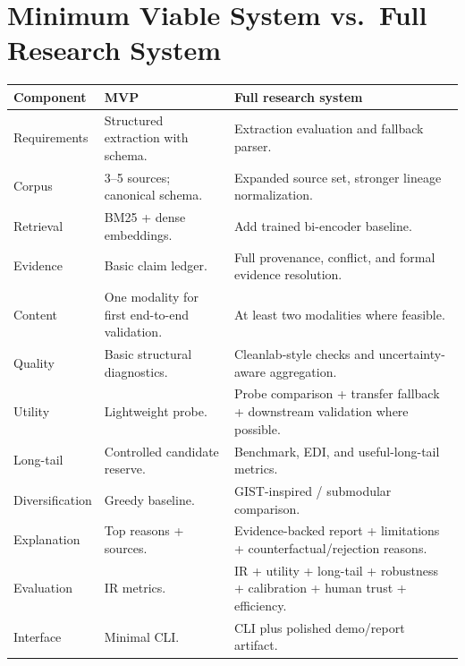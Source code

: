 \documentclass[11pt]{article}
\begin{document}
\section{Minimum Viable System vs.\ Full Research System}
\begin{longtable}{@{}L{2.5cm}L{5.0cm}L{5.5cm}@{}}
\toprule
\textbf{Component} & \textbf{MVP} & \textbf{Full research system} \\
\midrule
\endhead
Requirements & Structured extraction with schema. & Extraction evaluation and fallback parser. \\
Corpus & 3--5 sources; canonical schema. & Expanded source set, stronger lineage normalization. \\
Retrieval & BM25 + dense embeddings. & Add trained bi-encoder baseline. \\
Evidence & Basic claim ledger. & Full provenance, conflict, and formal evidence resolution. \\
Content & One modality for first end-to-end validation. & At least two modalities where feasible. \\
Quality & Basic structural diagnostics. & Cleanlab-style checks and uncertainty-aware aggregation. \\
Utility & Lightweight probe. & Probe comparison + transfer fallback + downstream validation where
  possible. \\
Long-tail & Controlled candidate reserve. & Benchmark, EDI, and useful-long-tail metrics. \\
Diversification & Greedy baseline. & GIST-inspired / submodular comparison. \\
Explanation & Top reasons + sources. & Evidence-backed report + limitations + counterfactual/rejection
  reasons. \\
Evaluation & IR metrics. & IR + utility + long-tail + robustness + calibration + human trust +
  efficiency. \\
Interface & Minimal CLI. & CLI plus polished demo/report artifact. \\
\bottomrule
\end{longtable}

\end{document}

